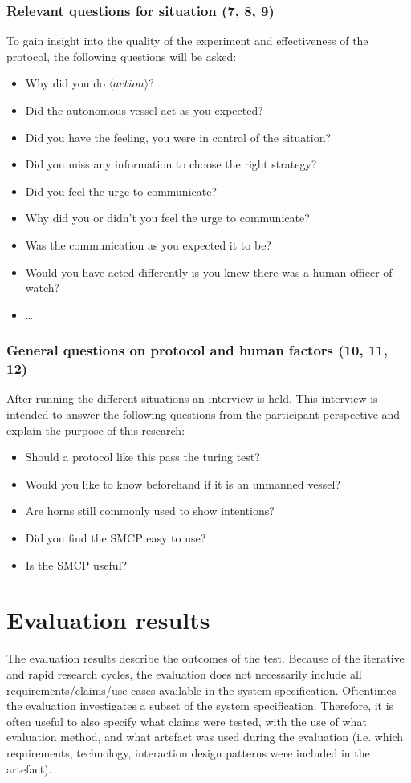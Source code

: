 \subsubsection{Relevant questions for situation (7, 8, 9)}
To gain insight into the quality of the experiment and effectiveness of the protocol, the following questions will be asked:
\begin{itemize}
	\item Why did you do $\langle action \rangle$?
	\item Did the autonomous vessel act as you expected?
	\item Did you have the feeling, you were in control of the situation?
	\item Did you miss any information to choose the right strategy?
	\item Did you feel the urge to communicate?
	\item Why did you or didn't you feel the urge to communicate?
	\item Was the communication as you expected it to be?
	\item Would you have acted differently is you knew there was a human officer of watch?
	\item \dots {}
\end{itemize}

\subsubsection{General questions on protocol and human factors (10, 11, 12)}
After running the different situations an interview is held. This interview is intended to answer the following questions from the participant perspective and explain the purpose of this research:
\begin{itemize}
	\item Should a protocol like this pass the turing test?
	\item Would you like to know beforehand if it is an unmanned vessel?
	\item Are horns still commonly used to show intentions?
	\item Did you find the SMCP easy to use?
	\item Is the SMCP useful?
\end{itemize}

\section{Evaluation results}
The evaluation results describe the outcomes of the test. Because of the iterative and rapid research cycles, the evaluation does not necessarily include all requirements/claims/use cases available in the system specification. Oftentimes the evaluation investigates a subset of the system specification. Therefore, it is often useful to also specify what claims were tested, with the use of what evaluation method, and what artefact was used during the evaluation (i.e. which requirements, technology, interaction design patterns were included in the artefact).

